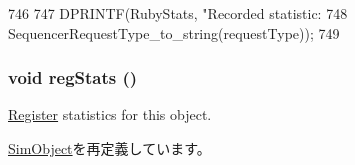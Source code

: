 \begin{DoxyCode}
746                                                              {
747     DPRINTF(RubyStats, "Recorded statistic: %
748             SequencerRequestType_to_string(requestType));
749 }
\end{DoxyCode}
\hypertarget{classSequencer_a4dc637449366fcdfc4e764cdf12d9b11}{
\subsubsection[{regStats}]{\setlength{\rightskip}{0pt plus 5cm}void regStats ()}}
\label{classSequencer_a4dc637449366fcdfc4e764cdf12d9b11}
\hyperlink{classRegister}{Register} statistics for this object. 

\hyperlink{classSimObject_a4dc637449366fcdfc4e764cdf12d9b11}{SimObject}を再定義しています。


